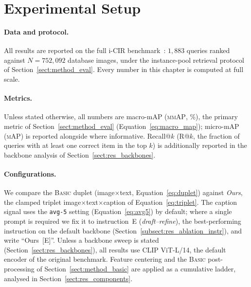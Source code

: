 \section{Experimental Setup}\label{sect:res_setup}

\paragraph{Data and protocol.} All results are reported on the full i-CIR
benchmark~\cite{psomas2025icir}: $1{,}883$ queries ranked against
$N = 752{,}092$ database images, under the instance-pool retrieval protocol of
Section~\ref{sect:method_eval}. Every number in this chapter is computed at full
scale.

\paragraph{Metrics.} Unless stated otherwise, all numbers are macro-mAP
(\textsc{mmAP}, \%), the primary metric of Section~\ref{sect:method_eval}
(Equation~\eqref{eq:macro_map}); micro-mAP (\textsc{mAP}) is reported alongside
where informative. Recall@$k$ (R@$k$, the fraction of queries with at least one
correct item in the top $k$) is additionally reported in the backbone analysis of
Section~\ref{sect:res_backbones}.

\paragraph{Configurations.} We compare the \textsc{Basic} duplet
(image$\times$text, Equation~\eqref{eq:duplet}) against \emph{Ours}, the
clamped triplet image$\times$text$\times$caption of
Equation~\eqref{eq:triplet}. The caption signal uses the \texttt{avg-5} setting
(Equation~\eqref{eq:avg5}) by default; where a single prompt is required we fix
it to instruction~\textsc{E} (\emph{draft--refine}), the best-performing
instruction on the default backbone (Section~\ref{subsect:res_ablation_instr}),
and write ``Ours~[\textsc{E}]''. Unless a backbone sweep is stated
(Section~\ref{sect:res_backbones}), all results use CLIP ViT-L/14, the default
encoder of the original benchmark. Feature centering and the \textsc{Basic}
post-processing of Section~\ref{sect:method_basic} are applied as a cumulative
ladder, analysed in Section~\ref{sect:res_components}.

